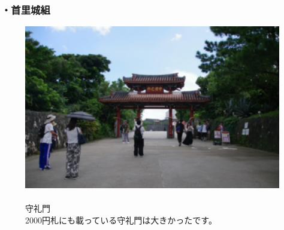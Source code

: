 \documentclass[../main]{subfiles}
\begin{document}
\subsubsection*{・首里城組}
\begin{figure}[H]
  \begin{minipage}[b]{0.48\columnwidth}
    \centering
    \includegraphics[width=\columnwidth]{figure/syureimon_bokasi.jpg}
  \end{minipage}
  \hspace{0.04\columnwidth} %
  \begin{minipage}[b]{0.48\columnwidth}
    \caption{\\
    守礼門\\
    2000円札にも載っている守礼門は大きかったです。
    }
  \end{minipage}
\end{figure}
\end{document}

